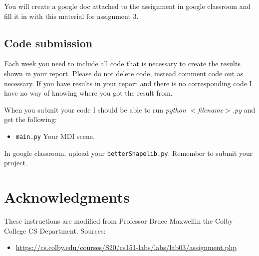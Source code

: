 \documentclass[12pt]{article}
\begin{document}
You will create a google doc attached to the assignment in google classroom and fill it in with this material for assignment 3. 

\subsection{Code submission}
Each week you need to include all code that is necessary to create the results shown in your report.
Please do not delete code, instead comment code out as necessary.
If you have results in your report and there is no corresponding code I have no way of knowing where you got the result from.

When you submit your code I should be able to run \textit{python $<$filename$>$.py} and get the following:
\begin{itemize}
  \item \texttt{main.py} Your MDI scene. 
\end{itemize}

In google classroom, upload your \texttt{betterShapelib.py}. 
Remember to submit your project.

\section{Acknowledgments}
These instructions are modified from Professor Bruce Maxwellin the Colby College CS Department. 
Sources:
\begin{itemize}
  \item \footnotesize{\url{https://cs.colby.edu/courses/S20/cs151-labs/labs/lab03/assignment.php}}
\end{itemize}
\end{document}
